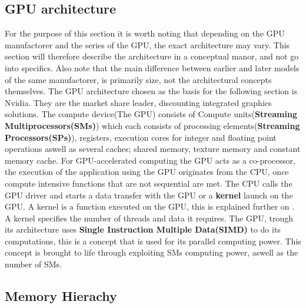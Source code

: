 \subsection{GPU architecture}
For the purpose of this section it is worth noting that depending on the GPU manufactorer and the series of the GPU, the exact architecture may vary.
This section will therefore describe the architecture in a conceptual manor, and not go into specifics. 
Also note that the main difference between earlier and later models of the same manufactorer, is primarily size, not the architectural concepts themselves.
The GPU architecture chosen as the basis for the following section is Nvidia. 
They are the market share leader, discounting integrated graphics solutions. 
The compute device(The GPU) consists of Compute units(\textbf{Streaming Multiprocessors(SMs)}) which each consists of processing elements(\textbf{Streaming Processors(SPs)}), registers, execution cores for integer and floating point operations aswell as several caches; shared memory, texture memory and constant memory cache.
For GPU-accelerated computing the GPU acts as a co-processor, the execution of the application using the GPU originates from the CPU, once compute intensive functions that are not sequential are met.
The CPU calls the GPU driver and starts a data transfer with the GPU or a \textbf{kernel} launch on the GPU.
A kernel is a function executed on the GPU, this is explained further on .
A kernel specifies the number of threads and data it requires.
The GPU, trough its architecture uses \textbf{Single Instruction Multiple Data(SIMD)} to do its computations, this is a concept that is used for its parallel computing power.
This concept is brought to life through exploiting SMs computing power, aswell as the number of SMs.
\subsection{Memory Hierachy}

